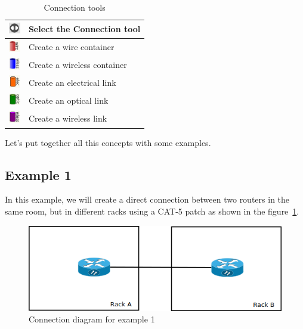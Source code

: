 \documentclass[a4paper]{article}
\begin{document}
		\begin{table}[h!]
			\centering
			\begin{tabular}{lp{10cm}}
				\includegraphics[width=0.5cm]{img/icon_connect_tool.png} & Select the Connection tool \\
				\midrule
				\includegraphics[width=0.5cm]{img/icon_wire_container.png} & Create a wire container \\
				\midrule
				\includegraphics[width=0.5cm]{img/icon_wireless_container.png} & Create a wireless container \\
				\midrule
				\includegraphics[width=0.5cm]{img/icon_electrical_link.png} & Create an electrical link \\
				\midrule
				\includegraphics[width=0.5cm]{img/icon_optical_link.png} & Create an optical link \\
				\midrule
				\includegraphics[width=0.5cm]{img/icon_wireless_link.png} & Create a wireless link \\
			\end{tabular}
			\caption{Connection tools}
		\end{table}
		Let's put together all this concepts  with some examples. 
		\subsection{Example 1} \label{sec:physical_connections_example_1}
			In this example, we will create a direct connection between two routers in the same room, but in different racks using a CAT-5 patch as shown in the figure~\ref{fig:l1_example_1}.\newline
			\begin{figure}[h!]
				\centering
				\includegraphics[width=0.5\linewidth]{img/l1_example_1.png}
				\caption{Connection diagram for example 1}
				\label{fig:l1_example_1}
			\end{figure}
			
\end{document}
